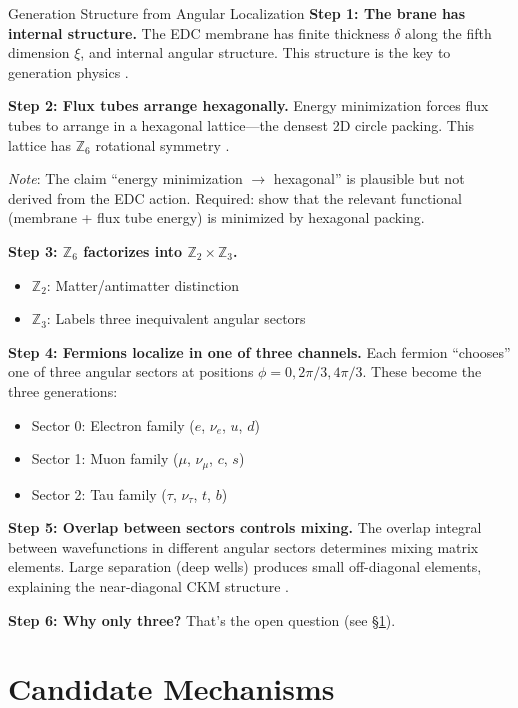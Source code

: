 \begin{mechanism}{Generation Structure from Angular Localization}
\textbf{Step 1: The brane has internal structure.}
The EDC membrane has finite thickness $\delta$ along the fifth dimension $\xi$,
and internal angular structure. This structure is the key to generation physics \tagP{}.

\textbf{Step 2: Flux tubes arrange hexagonally.}
Energy minimization forces flux tubes to arrange in a hexagonal lattice---the
densest 2D circle packing. This lattice has $\mathbb{Z}_6$ rotational symmetry \tagP{}.

\textit{Note}: The claim ``energy minimization $\to$ hexagonal'' is plausible but
not derived from the EDC action. Required: show that the relevant functional
(membrane + flux tube energy) is minimized by hexagonal packing.

\textbf{Step 3: $\mathbb{Z}_6$ factorizes into $\mathbb{Z}_2 \times \mathbb{Z}_3$.}
\begin{itemize}[nosep]
    \item $\mathbb{Z}_2$: Matter/antimatter distinction \tagP{}
    \item $\mathbb{Z}_3$: Labels three inequivalent angular sectors \tagP{}
\end{itemize}

\textbf{Step 4: Fermions localize in one of three channels.}
Each fermion ``chooses'' one of three angular sectors at positions
$\phi = 0, 2\pi/3, 4\pi/3$. These become the three generations:
\begin{itemize}[nosep]
    \item Sector 0: Electron family ($e$, $\nu_e$, $u$, $d$)
    \item Sector 1: Muon family ($\mu$, $\nu_\mu$, $c$, $s$)
    \item Sector 2: Tau family ($\tau$, $\nu_\tau$, $t$, $b$)
\end{itemize}

\textbf{Step 5: Overlap between sectors controls mixing.}
The overlap integral between wavefunctions in different angular sectors
determines mixing matrix elements. Large separation (deep wells) produces
small off-diagonal elements, explaining the near-diagonal CKM structure \tagI{}.

\textbf{Step 6: Why only three?} That's the open question (see \S\ref{sec:mechanisms}).
\end{mechanism}

\section{Candidate Mechanisms}
\label{sec:mechanisms}

